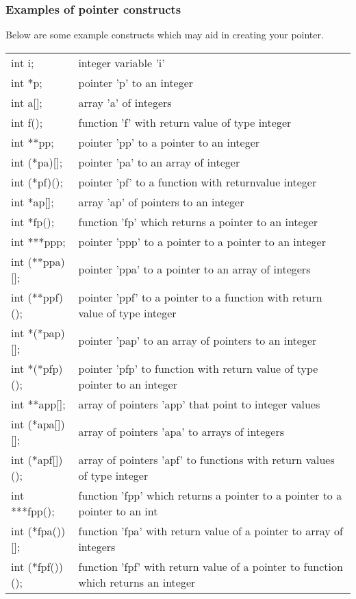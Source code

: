 \subsubsection{Examples of pointer constructs}
Below are some example constructs which may aid in creating your pointer.

\begin{tabular}{p{2.0cm} p{6.0cm}}
	int i;         & integer variable 'i'\\
	int *p;        & pointer 'p' to an integer\\
	int a[];       & array 'a' of integers\\
	int f();       & function 'f' with return value of type integer\\
	int **pp;      & pointer 'pp' to a pointer to an integer\\
	int (*pa)[];   & pointer 'pa' to an array of integer\\
	int (*pf)();   & pointer 'pf' to a function with returnvalue integer\\
	int *ap[];     & array 'ap' of pointers to an integer\\
	int *fp();     & function 'fp' which returns a pointer to an integer\\
	int ***ppp;    & pointer 'ppp' to a pointer to a pointer to an integer\\
	int (**ppa)[]; & pointer 'ppa' to a pointer to an array of integers\\
	int (**ppf)(); & pointer 'ppf' to a pointer to a function with return value of type integer\\
	int *(*pap)[]; & pointer 'pap' to an array of pointers to an integer\\
	int *(*pfp)(); & pointer 'pfp' to function with return value of type pointer to an integer\\
	int **app[];   & array of pointers 'app' that point to integer values\\
	int (*apa[])[];& array of pointers 'apa' to arrays of integers\\
	int (*apf[])();& array of pointers 'apf' to functions with return values of type integer\\
	int ***fpp();  & function 'fpp' which returns a pointer to a pointer to a pointer to an int\\
	int (*fpa())[];& function 'fpa' with return value of a pointer to array of integers\\
	int (*fpf())();& function 'fpf' with return value of a pointer to function which returns an integer
\end{tabular}

